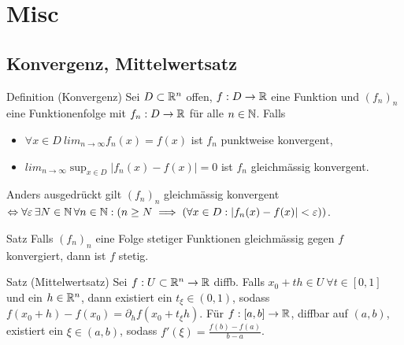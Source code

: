 \chapter{Misc}

%
%

\section{Konvergenz, Mittelwertsatz}

\begin{namedtheorem}{Definition (Konvergenz)}
  Sei $D\subset\mathbb{R}^n$ offen, $f:D\rightarrow\mathbb{R}$ eine Funktion und $(f_n)_n$ eine Funktionenfolge mit $f_n:D\rightarrow\mathbb{R}$ für alle $n\in\mathbb{N}$. Falls
  \begin{itemize}
    \item $\forall x\in D\ lim_{n\rightarrow\infty}f_n(x)=f(x)$ ist $f_n$ punktweise konvergent,
    \item $lim_{n\rightarrow\infty}\sup_{x\in D}|f_n(x)-f(x)|=0$ ist $f_n$ gleichmässig konvergent.
  \end{itemize}
  Anders ausgedrückt gilt $(f_n)_n$ gleichmässig konvergent $ \Leftrightarrow \forall\varepsilon\,\exists N\in\mathbb{N}\,\forall n\in\mathbb{N}: (n\geq N \implies (\forall x\in D: |f_n(x)-f(x)|<\varepsilon))$.
\end{namedtheorem}

\begin{namedtheorem}{Satz}
  Falls $(f_n)_n$ eine Folge stetiger Funktionen gleichmässig gegen $f$ konvergiert, dann ist $f$ stetig.
\end{namedtheorem}

\begin{namedtheorem}{Satz (Mittelwertsatz)}
Sei $f:U\subset\mathbb{R}^n\rightarrow\mathbb{R}$ diffb. Falls $x_0+th\in U\ \forall t\in[0,1]$ und ein $h\in\mathbb{R}^n$, dann existiert ein $t_{\xi}\in(0,1)$, sodass $f(x_0+h)-f(x_0)=\partial_h f(x_0+t_{\xi}h)$. Für $f:[a,b]\rightarrow\mathbb{R}$, diffbar auf $(a,b)$, existiert ein $\xi\in(a,b)$, sodass $f'(\xi)=\frac{f(b)-f(a)}{b-a}$.
\end{namedtheorem}


